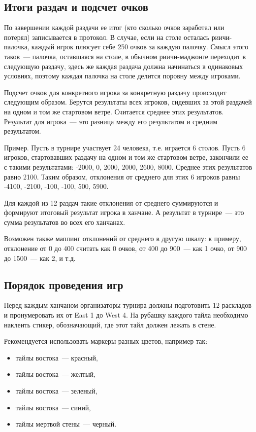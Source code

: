 \begin{additional}
\subsection{Итоги раздач и подсчет очков}

По завершении каждой раздачи ее итог (кто сколько очков заработал или потерял) записывается в протокол. В случае, если на столе осталась риичи-палочка, каждый игрок плюсует себе 250 очков за каждую палочку. Смысл этого таков~--- палочка, оставшаяся на столе, в обычном риичи-маджонге переходит в следующую раздачу, здесь же каждая раздача должна начинаться в одинаковых условиях, поэтому каждая палочка на столе делится поровну между игроками.

Подсчет очков для конкретного игрока за конкретную раздачу происходит следующим образом. Берутся результаты всех игроков, сидевших за этой раздачей на одном и том же стартовом ветре. Считается среднее этих результатов. Результат для игрока~--- это разница между его результатом и средним результатом.

Пример. Пусть в турнире участвует 24 человека, т.е. играется 6 столов. Пусть 6 игроков, стартовавших раздачу на одном и том же стартовом ветре, закончили ее с такими результатами: -2000, 0, 2000, 2000, 2600, 8000. Среднее этих результатов равно 2100. Таким образом, отклонения от среднего для этих 6 игроков равны -4100, -2100, -100, -100, 500, 5900.

Для каждой из 12 раздач такие отклонения от среднего суммируются и формируют итоговый результат игрока в ханчане. А результат в турнире~--- это сумма результатов во всех его ханчанах.

Возможен также маппинг отклонений от среднего в другую шкалу: к примеру, отклонение от 0 до 400 считать как 0 очков, от 400 до 900~--- как 1 очко, от 900 до 1500~--- как 2, и т.д.

\subsection{Порядок проведения игр}

Перед каждым ханчаном организаторы турнира должны подготовить 12 раскладов и пронумеровать их от East 1 до West 4. На рубашку каждого тайла необходимо наклеить стикер, обозначающий, где этот тайл должен лежать в стене.

Рекомендуется использовать маркеры разных цветов, например так:

\begin{itemize}
	\item тайлы востока~--- красный,
	\item тайлы востока~--- желтый,
	\item тайлы востока~--- зеленый,
	\item тайлы востока~--- синий,
	\item тайлы мертвой стены~--- черный.
\end{itemize}


\end{additional}
